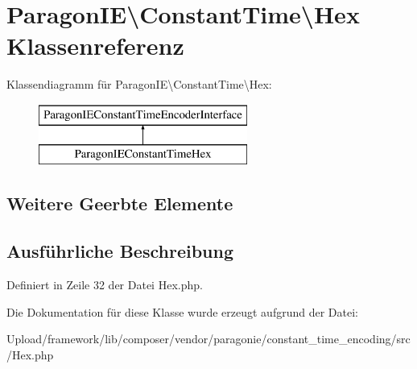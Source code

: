 \hypertarget{class_paragon_i_e_1_1_constant_time_1_1_hex}{}\section{Paragon\+IE\textbackslash{}Constant\+Time\textbackslash{}Hex Klassenreferenz}
\label{class_paragon_i_e_1_1_constant_time_1_1_hex}
Klassendiagramm für Paragon\+IE\textbackslash{}Constant\+Time\textbackslash{}Hex\+:\begin{figure}[H]
\begin{center}
\leavevmode
\includegraphics[height=2.000000cm]{class_paragon_i_e_1_1_constant_time_1_1_hex}
\end{center}
\end{figure}
\subsection*{Weitere Geerbte Elemente}


\subsection{Ausführliche Beschreibung}


Definiert in Zeile 32 der Datei Hex.\+php.



Die Dokumentation für diese Klasse wurde erzeugt aufgrund der Datei\+:\begin{DoxyCompactItemize}
\item 
Upload/framework/lib/composer/vendor/paragonie/constant\+\_\+time\+\_\+encoding/src/Hex.\+php\end{DoxyCompactItemize}
